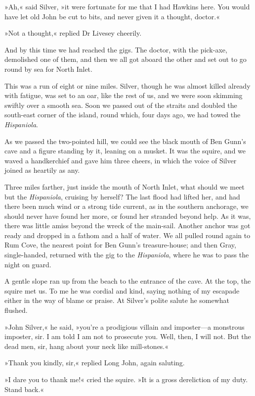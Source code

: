 »Ah,« said Silver, »it were fortunate for me that I had Hawkins here. You would have let old John be cut to bits, and never given it a thought, doctor.«

»Not a thought,« replied Dr Livesey cheerily.

And by this time we had reached the gigs. The doctor, with the pick-axe, demolished one of them, and then we all got aboard the other and set out to go round by sea for North Inlet.

This was a run of eight or nine miles. Silver, though he was almost killed already with fatigue, was set to an oar, like the rest of us, and we were soon skimming swiftly over a smooth sea. Soon we passed out of the straits and doubled the south-east corner of the island, round which, four days ago, we had towed the \textit{Hispaniola}.

As we passed the two-pointed hill, we could see the black mouth of Ben Gunn's cave and a figure standing by it, leaning on a musket. It was the squire, and we waved a handkerchief and gave him three cheers, in which the voice of Silver joined as heartily as any.

Three miles farther, just inside the mouth of North Inlet, what should we meet but the \textit{Hispaniola}, cruising by herself? The last flood had lifted her, and had there been much wind or a strong tide current, as in the southern anchorage, we should never have found her more, or found her stranded beyond help. As it was, there was little amiss beyond the wreck of the main-sail. Another anchor was got ready and dropped in a fathom and a half of water. We all pulled round again to Rum Cove, the nearest point for Ben Gunn's treasure-house; and then Gray, single-handed, returned with the gig to the \textit{Hispaniola}, where he was to pass the night on guard.

A gentle slope ran up from the beach to the entrance of the cave. At the top, the squire met us. To me he was cordial and kind, saying nothing of my escapade either in the way of blame or praise. At Silver's polite salute he somewhat flushed.

»John Silver,« he said, »you're a prodigious villain and imposter—a monstrous imposter, sir. I am told I am not to prosecute you. Well, then, I will not. But the dead men, sir, hang about your neck like mill-stones.«

»Thank you kindly, sir,« replied Long John, again saluting.

»I dare you to thank me!« cried the squire. »It is a gross dereliction of my duty. Stand back.«

